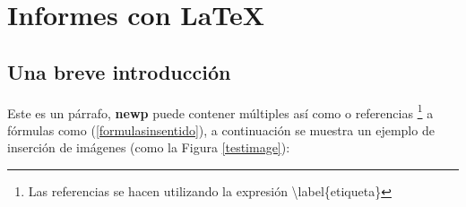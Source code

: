 %
%

\section{Informes con \LaTeX}

	\subsection{Una breve introducción}
	
		\lipsum[4]
		
		
		Este es un párrafo, \textbf{newp} puede contener múltiples  así como  o referencias \footnote{Las referencias se hacen utilizando la expresión \textbackslash label\{etiqueta\}} a fórmulas como (\ref{formulasinsentido}), a continuación se muestra un ejemplo de inserción de imágenes (como la Figura \ref{testimage}):
		
